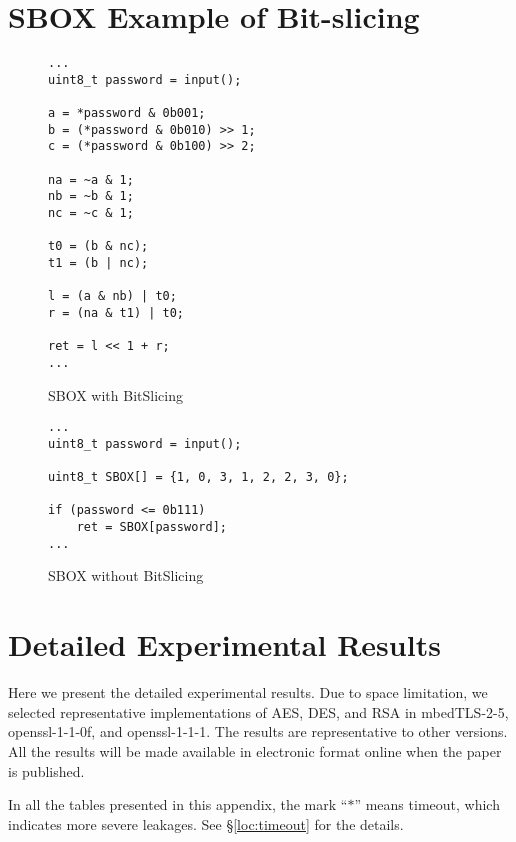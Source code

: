 \clearpage
\section{SBOX Example of Bit-slicing}
\label{appendix:SBOX}

\begin{figure}[h!]
      \centering
      \begin{lstlisting}[xleftmargin=.02\textwidth,xrightmargin=.01\textwidth]
...
uint8_t password = input();

a = *password & 0b001;
b = (*password & 0b010) >> 1;
c = (*password & 0b100) >> 2;

na = ~a & 1;
nb = ~b & 1;
nc = ~c & 1;

t0 = (b & nc);
t1 = (b | nc);

l = (a & nb) | t0;
r = (na & t1) | t0;

ret = l << 1 + r;
...
      \end{lstlisting}
      \caption{SBOX with BitSlicing}
      \label{fig:SBOX_bitslicing}
\end{figure}

\begin{figure}[h!]
      \centering
      \begin{lstlisting}[xleftmargin=.02\textwidth,xrightmargin=.01\textwidth]
...
uint8_t password = input();

uint8_t SBOX[] = {1, 0, 3, 1, 2, 2, 3, 0};

if (password <= 0b111)
    ret = SBOX[password];
...
      \end{lstlisting}
      \caption{SBOX without BitSlicing}
      \label{fig:SBOX_da}
\end{figure}

\section{Detailed Experimental Results}
\label{sec:result-table}

Here we present the detailed experimental results.
Due to space limitation, we selected representative implementations of
AES, DES, and RSA in
mbedTLS-2-5, 
openssl-1-1-0f,  and
openssl-1-1-1.  
The results are representative to other versions.
All the results will be made available in electronic format online
when the paper is published. %

In all the tables presented in this appendix, the mark
``$*$'' means timeout, which indicates more severe leakages.
See \S\ref{loc:timeout} for the details.

